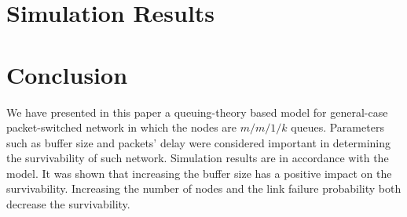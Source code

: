 \documentclass[onecolumn,conference]{IEEEtran}
\begin{document}
    \section{Simulation Results} \label{sec:simres}

    \section{Conclusion} \label{sec:conc}
    We have presented in this paper a queuing-theory based model for general-case packet-switched network in which the nodes are $m/m/1/k$ queues. Parameters such as buffer size and packets' delay were considered important in determining the survivability of such network. Simulation results are in accordance with the model. It was shown that increasing the buffer size has a positive impact on the survivability. Increasing the number of nodes and the link failure probability both decrease the survivability.
\end{document}
